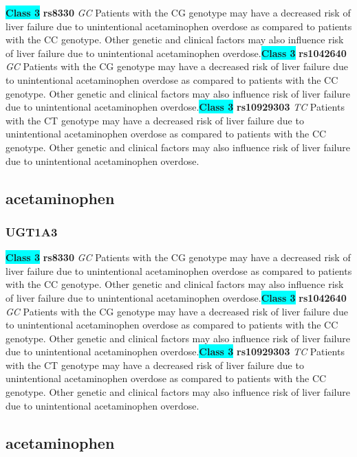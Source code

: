 \documentclass{book}
\begin{document}
\begin{center}
\textbf{\colorbox{cyan} {Class 3}} \textbf{ rs8330 } \textit{ GC }
Patients with the CG genotype may have a decreased risk of liver failure due to unintentional acetaminophen overdose as compared to patients with the CC genotype. Other genetic and clinical factors may also influence risk of liver failure due to unintentional acetaminophen overdose.\textbf{\colorbox{cyan} {Class 3}} \textbf{ rs1042640 } \textit{ GC }
Patients with the CG genotype may have a decreased risk of liver failure due to unintentional acetaminophen overdose as compared to patients with the CC genotype. Other genetic and clinical factors may also influence risk of liver failure due to unintentional acetaminophen overdose.\textbf{\colorbox{cyan} {Class 3}} \textbf{ rs10929303 } \textit{ TC }
Patients with the CT genotype may have a decreased risk of liver failure due to unintentional acetaminophen overdose as compared to patients with the CC genotype. Other genetic and clinical factors may also influence risk of liver failure due to unintentional acetaminophen overdose.


\end{center}\subsection{ acetaminophen }


\subsubsection{ UGT1A3 }

\begin{center}
\textbf{\colorbox{cyan} {Class 3}} \textbf{ rs8330 } \textit{ GC }
Patients with the CG genotype may have a decreased risk of liver failure due to unintentional acetaminophen overdose as compared to patients with the CC genotype. Other genetic and clinical factors may also influence risk of liver failure due to unintentional acetaminophen overdose.\textbf{\colorbox{cyan} {Class 3}} \textbf{ rs1042640 } \textit{ GC }
Patients with the CG genotype may have a decreased risk of liver failure due to unintentional acetaminophen overdose as compared to patients with the CC genotype. Other genetic and clinical factors may also influence risk of liver failure due to unintentional acetaminophen overdose.\textbf{\colorbox{cyan} {Class 3}} \textbf{ rs10929303 } \textit{ TC }
Patients with the CT genotype may have a decreased risk of liver failure due to unintentional acetaminophen overdose as compared to patients with the CC genotype. Other genetic and clinical factors may also influence risk of liver failure due to unintentional acetaminophen overdose.


\end{center}\subsection{ acetaminophen }
\end{document}
